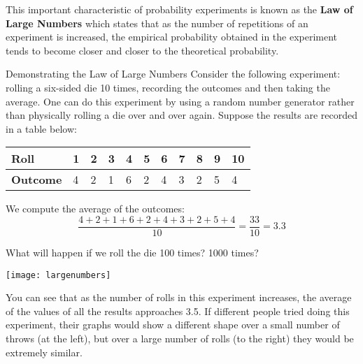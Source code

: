This important characteristic of probability experiments is known as the \textbf{Law of Large Numbers} which states that as the number of repetitions of an experiment is increased, the empirical probability obtained in the experiment tends to become closer and closer to the theoretical probability.

\begin{example}[https://www.youtube.com/watch?v=UbKc9wadf64&list=PLfmpjsIzhzts14-9s5QixRje97EI2oeMF&index=9]{Demonstrating the Law of Large Numbers}
Consider the following experiment: rolling a six-sided die 10 times, recording the outcomes and then taking the average. One can do this experiment by using a random number generator rather than physically rolling a die over and over again. Suppose the results are recorded in a table below: \\

\begin{center}
\begin{tabular}{l | l l l l l l l l l l}
\textbf{Roll} & 1 & 2 & 3 & 4 & 5 & 6 & 7 & 8 & 9 & 10 \\ \hline
\textbf{Outcome} & 4 & 2 & 1 & 6 & 2 & 4 & 3 & 2 & 5 & 4
\end{tabular}
\end{center}
We compute the average of the outcomes: 
\[  \dfrac{ 4 + 2 + 1 + 6 + 2 + 4 + 3 + 2 + 5 + 4}{10} = \frac{33}{10} = 3.3 \]

What will happen if we roll the die 100 times? 1000 times? 

\begin{center}
\texttt{[image: largenumbers]}
\end{center}
You can see that as the number of rolls in this experiment increases, the average of the values of all the results approaches 3.5. If different people tried doing this experiment, their graphs would show a different shape over a small number of throws (at the left), but over a large number of rolls (to the right) they would be extremely similar.
\end{example}



